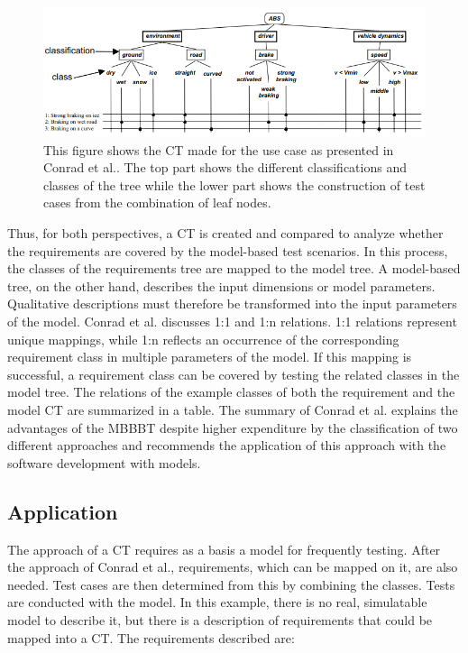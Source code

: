 \begin{figure}[H]
\centering
\includegraphics[scale=0.75]{../../individual/groeger/images/ClassificationTreeExample.png} 
\caption{This figure shows the CT made for the use case as presented in Conrad et al.\cite{Conrad2005}. The top part shows the different classifications and classes of the tree while the lower part shows the construction of test cases from the combination of leaf nodes.}
\label{fig:ABS_CT}
\end{figure}

Thus, for both perspectives, a CT is created and compared to analyze whether the requirements are covered by the model-based test scenarios. In this process, the classes of the requirements tree are mapped to the model tree. A model-based tree, on the other hand, describes the input dimensions or model parameters. Qualitative descriptions must therefore be transformed into the input parameters of the model. Conrad et al.\cite{Conrad2005} discusses 1:1 and 1:n relations. 1:1 relations represent unique mappings, while 1:n reflects an occurrence of the corresponding requirement class in multiple parameters of the model. If this mapping is successful, a requirement class can be covered by testing the related classes in the model tree. The relations of the example classes of both the requirement and the model CT are summarized in a table. The summary of Conrad et al.\cite{Conrad2005} explains the advantages of the MBBBT despite higher expenditure by the classification of two different approaches and recommends the application of this approach with the software development with models.

\subsection{Application}

The approach of a CT requires as a basis a model for frequently testing. After the approach of Conrad et al.\cite{Conrad2005},  requirements, which can be mapped on it, are also needed. Test cases are then determined from this by combining the classes. Tests are conducted with the model. In this example, there is no real, simulatable model to describe it, but there is a description of requirements that could be mapped into a CT. The requirements described are:

